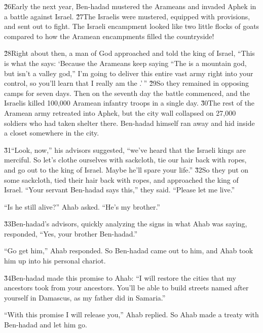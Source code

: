 \v{26}Early the next year, Ben-hadad mustered the Arameans and invaded Aphek in a battle against Israel. \v{27}The Israelis were mustered, equipped with provisions, and sent out to fight. The Israeli encampment looked like two little flocks of goats compared to how the Aramean encampments filled the countryside!

\v{28}Right about then, a man of God approached and told the king of Israel, ``This is what the  says: `Because the Arameans keep saying ``The  is a mountain god, but isn't a valley god,'' I'm going to deliver this entire vast army right into your control, so you'll learn that I really am the .'\,'' \v{29}So they remained in opposing camps for seven days. Then on the seventh day the battle commenced, and the Israelis killed 100,000 Aramean infantry troops in a single day. \v{30}The rest of the Aramean army retreated into Aphek, but the city wall collapsed on 27,000 soldiers who had taken shelter there. Ben-hadad himself ran away and hid inside a closet somewhere in the city.

\v{31}``Look, now,'' his advisors suggested, ``we've heard that the Israeli kings are merciful. So let's clothe ourselves with sackcloth, tie our hair back with ropes, and go out to the king of Israel. Maybe he'll spare your life.'' \v{32}So they put on some sackcloth, tied their hair back with ropes, and approached the king of Israel. ``Your servant Ben-hadad says this,'' they said. ``Please let me live.''

``Is he still alive?'' Ahab asked. ``He's my brother.''

\v{33}Ben-hadad's advisors, quickly analyzing the signs in what Ahab was saying, responded, ``Yes, your brother Ben-hadad.''

``Go get him,'' Ahab responded. So Ben-hadad came out to him, and Ahab took him up into his personal chariot.

\v{34}Ben-hadad made this promise to Ahab: ``I will restore the cities that my ancestors took from your ancestors. You'll be able to build streets named after yourself in Damascus, as my father did in Samaria.''

``With this promise I will release you,'' Ahab replied. So Ahab made a treaty with Ben-hadad and let him go.

